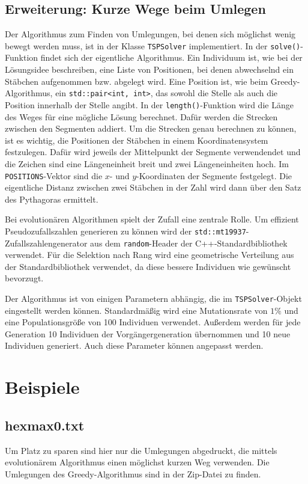 \documentclass[a4paper,10pt,ngerman]{scrartcl}
\begin{document}
\subsection{Erweiterung: Kurze Wege beim Umlegen}
Der Algorithmus zum Finden von Umlegungen, bei denen sich möglichst wenig bewegt werden muss, ist in der Klasse \lstinline{TSPSolver} implementiert. In der \lstinline{solve()}-Funktion findet sich der eigentliche Algorithmus. 
Ein Individuum ist, wie bei der Lösungsidee beschreiben, eine Liste von Positionen, bei denen abwechselnd ein Stäbchen aufgenommen bzw. abgelegt wird. 
Eine Position ist, wie beim Greedy-Algorithmus, ein \lstinline{std::pair<int, int>}, das sowohl die Stelle als auch die Position innerhalb der Stelle angibt. 
In der \lstinline{length()}-Funktion wird die Länge des Weges für eine mögliche Lösung berechnet. 
Dafür werden die Strecken zwischen den Segmenten addiert. 
Um die Strecken genau berechnen zu können, ist es wichtig, die Positionen der Stäbchen in einem Koordinatensystem festzulegen. 
Dafür wird jeweils der Mittelpunkt der Segmente verwendendet und die Zeichen sind eine Längeneinheit breit und zwei Längeneinheiten hoch.
Im \lstinline{POSITIONS}-Vektor sind die $x$- und $y$-Koordinaten der Segmente festgelegt. 
Die eigentliche Distanz zwischen zwei Stäbchen in der Zahl wird dann über den Satz des Pythagoras ermittelt. 

Bei evolutionären Algorithmen spielt der Zufall eine zentrale Rolle. 
Um effizient Pseudozufallszahlen generieren zu können wird der \lstinline{std::mt19937}-Zufallszahlengenerator aus dem \lstinline{random}-Header der C++-Standardbibliothek verwendet. 
Für die Selektion nach Rang wird eine geometrische Verteilung aus der Standardbibliothek verwendet, da diese bessere Individuen wie gewünscht bevorzugt.

Der Algorithmus ist von einigen Parametern abhängig, die im \lstinline{TSPSolver}-Objekt eingestellt werden können. 
Standardmäßig wird eine Mutationsrate von $1\%$ und eine Populationsgröße von 100 Individuen verwendet. 
Außerdem werden für jede Generation 10 Individuen der Vorgängergeneration übernommen und 10 neue Individuen generiert. Auch diese Parameter können angepasst werden. 


\section{Beispiele}
\subsection*{hexmax0.txt}

Um Platz zu sparen sind hier nur die Umlegungen abgedruckt, die mittels evolutionärem Algorithmus einen möglichst kurzen Weg verwenden. Die Umlegungen des Greedy-Algorithmus sind in der Zip-Datei zu finden.
\end{document}
